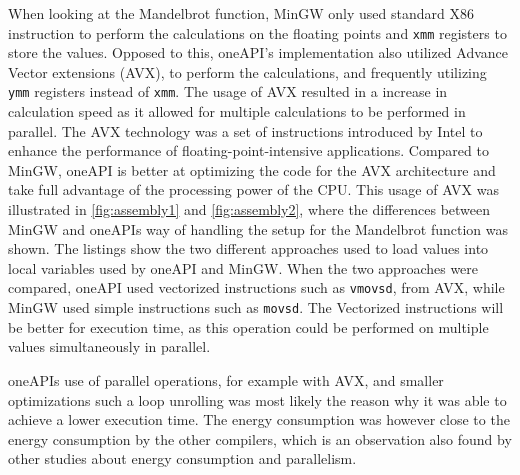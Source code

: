 When looking at the Mandelbrot function, MinGW only used standard X86 instruction\cite{X86} to perform the calculations on the floating points and \texttt{xmm} registers to store the values. Opposed to this, oneAPI's implementation also utilized Advance Vector extensions (AVX)\cite{AVXIntel}, to perform the calculations, and frequently utilizing \texttt{ymm} registers instead of \texttt{xmm}. The usage of AVX resulted in a increase in calculation speed as it allowed for multiple calculations to be performed in parallel. The AVX technology was a set of instructions introduced by Intel to enhance the performance of floating-point-intensive applications\cite{AVXIntel}. Compared to MinGW, oneAPI is better at optimizing the code for the AVX architecture and take full advantage of the processing power of the CPU. This usage of AVX was illustrated in \cref{fig:assembly1} and \cref{fig:assembly2}, where the differences between MinGW and oneAPIs way of handling the setup for the Mandelbrot function was shown. The listings show the two different approaches used to load values into local variables used by oneAPI and MinGW. When the two approaches were compared, oneAPI used vectorized instructions such as \texttt{vmovsd}, from AVX, while MinGW used simple instructions such as \texttt{movsd}. The Vectorized instructions will be better for execution time, as this operation could be performed on multiple values simultaneously in parallel.

oneAPIs use of parallel operations, for example with AVX, and smaller optimizations such a loop unrolling was most likely the reason why it was able to achieve a lower execution time. The energy consumption was however close to the energy consumption by the other compilers, which is an observation also found by other studies about energy consumption and parallelism\cite{Lindholt2022}. %







